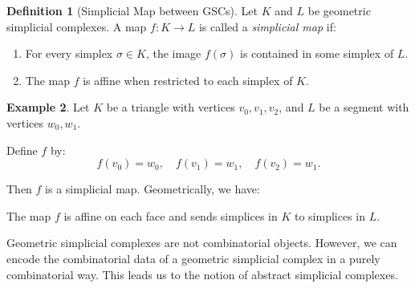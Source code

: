 \documentclass[11pt]{article}
\theoremstyle{definition}
\newtheorem{definition}{Definition}[section]
\newtheorem{example}[definition]{Example}
\theoremstyle{plain}
\begin{document}
\begin{definition}[Simplicial Map between GSCs]
    Let $K$ and $L$ be geometric simplicial complexes. A map $f : K \to L$ is called a \emph{simplicial map} if:

    \begin{enumerate}
        \item For every simplex $\sigma \in K$, the image $f(\sigma)$ is contained in some simplex of $L$.
        \item The map $f$ is affine when restricted to each simplex of $K$.
    \end{enumerate}
\end{definition}

\begin{example}
    Let $K$ be a triangle with vertices $v_0, v_1, v_2$, and $L$ be a segment with vertices $w_0, w_1$.

    Define $f$ by:
    \[
        f(v_0) = w_0, \quad f(v_1) = w_1, \quad f(v_2) = w_1.
    \]

    Then $f$ is a simplicial map. Geometrically, we have:
    \begin{center}
    \end{center}

    The map $f$ is affine on each face and sends simplices in $K$ to simplices in $L$.
\end{example}

Geometric simplicial complexes are not combinatorial objects. However, we can encode the combinatorial data of a geometric simplicial complex in a purely combinatorial way. This leads us to the notion of abstract simplicial complexes.
\end{document}

